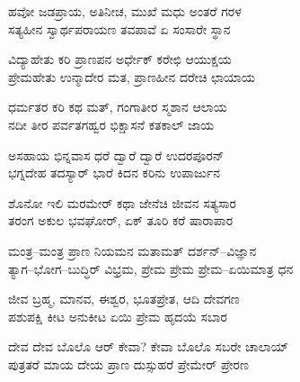 \begin{myquote}
ಹವೋ ಜಡಪ್ರಾಯ, ಅತಿನೀಚ, ಮುಖೆ ಮಧು ಅಂತರೆ ಗರಳ\\ಸತ್ಯಹೀನ ಸ್ವಾರ್ಥಪರಾಯಣ ತವಪಾವೆ ಏ ಸಂಸಾರೇ ಸ್ಥಾನ
\end{myquote}


\begin{myquote}
ವಿದ್ಯಾಹೇತು ಕರಿ ಪ್ರಾಣಪನ ಅರ್ಧೇಕ್ ಕರೇಛಿ ಆಯುಕ್ಷಯ\\ಪ್ರೇಮಹೇತು ಉನ್ಮಾದೇರ ಮತ, ಪ್ರಾಣಹೀನ ದರೇಚಿ ಛಾಯಾಯ
\end{myquote}


\begin{myquote}
ಧರ್ಮತರ ಕರಿ ಕಥ ಮತ್, ಗಂಗಾತೀರ ಸ್ಮಶಾನ ಆಲಾಯ\\ನದೀ ತೀರ ಪರ್ವತಗಹ್ವರ ಭಿಕ್ಷಾಸನೆ ಕತಕಾಲ್ ಜಾಯ
\end{myquote}


\begin{myquote}
ಅಸಹಾಯ ಭಿನ್ನವಾಸ ಧರೆ ದ್ವಾರೆ ದ್ವಾರೆ ಉದರಪೂರನ್\\ಭಗ್ನದೇಹ ತದಸ್ಯಾರ್‌ ಭಾರೆ ಕಿದನ ಕರಿನು ಉಪಾರ್ಜುನ
\end{myquote}


\begin{myquote}
ಶೊನೋ ಇಲಿ ಮರಮೇರ್ ಕಥಾ ಜೇನೆಚಿ ಜೀವನ ಸತ್ಯಸಾರ\\ತರಂಗ ಅಕುಲ ಭವಘೋರ್, ಏಕ್ ತೂರಿ ಕರೆ ಷಾರಾಪಾರ
\end{myquote}


\begin{myquote}
ಮಂತ್ರ–ಮಂತ್ರ ಪ್ರಾಣ ನಿಯಮನ ಮತಾಮತ್ ದರ್ಶನ್–ವಿಜ್ಞಾನ\\ತ್ಯಾಗ–ಭೋಗ–ಬುದ್ಧಿ‌ರ್ ವಿಭ್ರಮ, ಪ್ರೇಮ ಪ್ರೇಮ ಪ್ರೇಮ–ಏಯಿಮಾತ್ರ ಧನ
\end{myquote}


\begin{myquote}
ಜೀವ ಬ್ರಹ್ಮ, ಮಾನವ, ಈಶ್ವರ, ಭೂತಪ್ರೇತ, ಆದಿ ದೇವಗಣ\\ಪಶುಪಕ್ಷಿ ಕೀಟ ಅನುಕೀಟ ಏಯಿ ಪ್ರೇಮ ಹೃದಯೆ ಸಬಾರ
\end{myquote}


\begin{myquote}
ದೇವ ದೇವ ಬೊಲೊ ಆರ್ ಕೇವಾ? ಕೇವಾ ಬೊಲೊ ಸಬರೇ ಚಾಲಾಯ್\\ಪುತ್ರತರೆ ಮಾಯ ದೇಯ ಪ್ರಾಣ ದುಸ್ಸುಹರೆ ಪ್ರೇಮೇರ್‌ ಪ್ರೇರಣ
\end{myquote}

